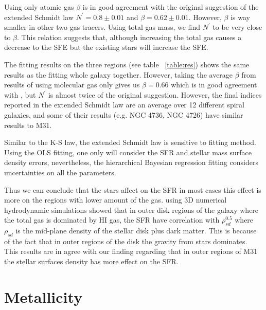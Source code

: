 \documentclass[useAMS,usenatbib]{mn2e}
\newcommand \eqnprime {N^\prime}
\begin{document}
Using only atomic gas $\beta$ is in good agreement with the original suggestion of the extended Schmidt law $\eqnprime = 0.8 \pm 0.01$ and $\beta = 0.62\pm0.01$. However, $\beta$ is way smaller in other two gas tracers. Using total gas mass, we find $\eqnprime$ to be very close to $\beta$. This relation suggests that, although increasing the total gas causes a decrease to the SFE but the existing stars will increase the SFE. 

The fitting results on the three regions (see table ~\ref{table:res}) shows the same results as the fitting whole galaxy together. However, taking the average $\beta$ from results of using molecular gas only gives us $\beta = 0.66$ which is in good agreement with \cite{Shi11}, but $\eqnprime$ is almost twice of the original suggestion. However, the final indices reported in the extended Schmidt law are an average over 12 different spiral galaxies, and some of their results (e.g. NGC 4736, NGC 4726) have similar results to M31. 

Similar to the K-S law, the extended Schmidt law is sensitive to fitting method. Using the OLS fitting, one only will consider the SFR and stellar mass surface density errors, nevertheless, the hierarchical Bayesian regression fitting considers uncertainties on all the parameters.
 

Thus we can conclude that the stars affect on the SFR in most cases this effect is more on the regions with lower amount of the gas. \cite{Kim13} using 3D numerical hydrodynamic simulations showed that in outer disk regions of the galaxy  where the total gas is dominated by HI gas, the SFR have correlation with $\rho_{sd}^{0.5}$ where $\rho_{sd}$ is the mid-plane density of the stellar disk plus dark matter. This is because of the fact that in outer regions of the disk the gravity from stars dominates. This results are in agree with our finding regarding that in outer regions of M31 the stellar surfaces density has more effect on the SFR.%

\section{Metallicity}
\end{document}
